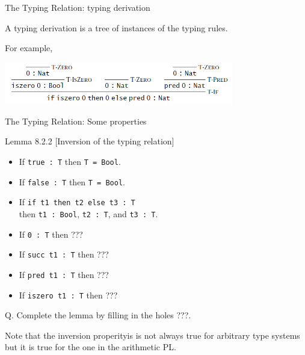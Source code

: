 \documentclass[table]{beamer}
\begin{document}
\begin{frame}[t]{The Typing Relation: typing derivation} \vspace{10pt}

A typing derivation is a tree of instances of the typing rules. 

\vspace{10pt}

For example,

\includegraphics[width=10cm]{typingderivation_ch8}

\end{frame}

\begin{frame}[t]{The Typing Relation: Some properties} \vspace{10pt}

Lemma 8.2.2 [Inversion of the typing relation]
\begin{itemize}
\item If \texttt{true : T} then \texttt{T = Bool}.
\item If \texttt{false : T} then \texttt{T = Bool}.
\item If \texttt{if t1 then t2 else t3 : T} \\ then \texttt{t1 : Bool}, \texttt{t2 : T}, and \texttt{t3 : T}.
\item If \texttt{0 : T} then ??? %
\item If \texttt{succ t1 : T} then ??? %
\item If \texttt{pred t1 : T} then ??? %
\item If \texttt{iszero t1 : T} then ??? %
\end{itemize}

\vspace{10pt}

Q. Complete the lemma by filling in the holes ???.

\vspace{10pt}

Note that the inversion properityis is not always true for arbitrary type systems but it is true for the one in the arithmetic PL. 

\end{frame}
\end{document}
